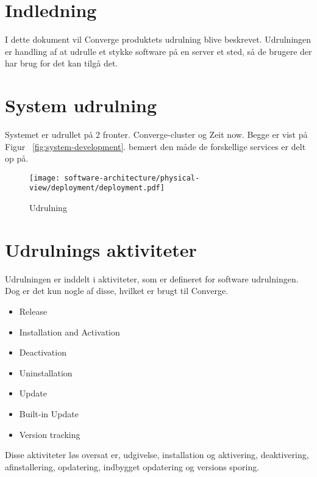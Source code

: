 \chapter{Indledning}

I dette dokument vil Converge produktets udrulning blive beskrevet. Udrulningen er handling af at udrulle et stykke software på en server et sted, så de brugere der har brug for det kan tilgå det.

\chapter{System udrulning}

Systemet er udrullet på 2 fronter. Converge-cluster og Zeit now. Begge er vist på Figur ~\ref{fig:system-development}. bemært den måde de forskellige services er delt op på.

\begin{figure}[H]
    \begin{small}
        \begin{center}
            \texttt{[image: software-architecture/physical-view/deployment/deployment.pdf]}
        \end{center}
        \caption{Udrulning}
        \label{fig:system-deployment}
    \end{small}
\end{figure}


\chapter{Udrulnings aktiviteter}

Udrulningen er inddelt i aktiviteter, som er defineret for software udrulningen. Dog er det kun nogle af disse, hvilket er brugt til Converge.

\begin{itemize}
    \item Release
    \item Installation and Activation
    \item Deactivation
    \item Uninstallation
    \item Update
    \item Built-in Update
    \item Version tracking
\end{itemize}

Disse aktiviteter løs oversat er, udgivelse, installation og aktivering, deaktivering, afinstallering, opdatering, indbygget opdatering og versions sporing.

